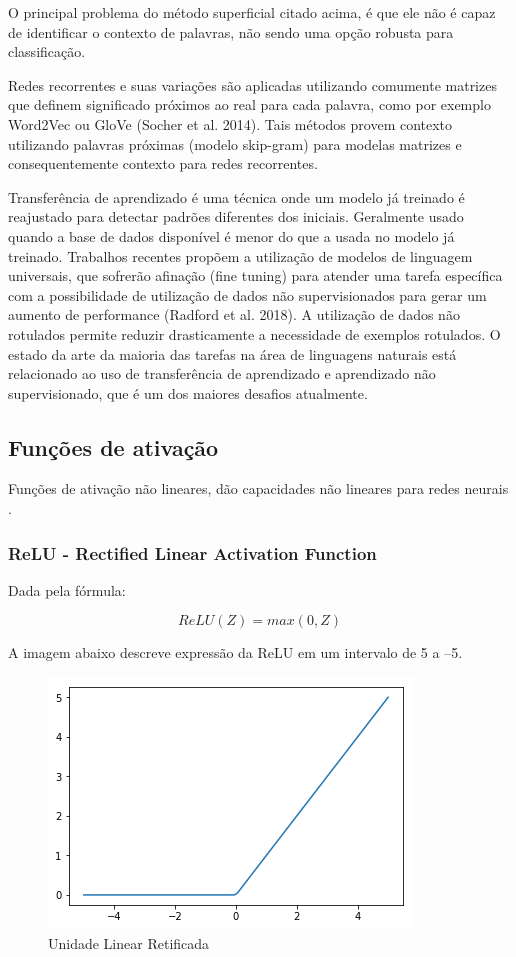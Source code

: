 \documentclass[12pt]{article}
\begin{document}
O principal problema do método superficial citado acima, é que ele não é capaz de identificar o contexto de palavras, não sendo uma opção robusta para classificação.

Redes recorrentes e suas variações são aplicadas utilizando comumente matrizes que definem significado próximos ao real para cada palavra, como por exemplo Word2Vec \cite{DBLP:journals/corr/abs-1301-3781} ou GloVe (Socher et al. 2014). Tais métodos provem contexto utilizando palavras próximas (modelo skip-gram) para modelas matrizes e consequentemente contexto para redes recorrentes.

Transferência de aprendizado é uma técnica onde um modelo já treinado é reajustado para detectar padrões diferentes dos iniciais. Geralmente usado quando a base de dados disponível é menor do que a usada no modelo já treinado. Trabalhos recentes propõem a utilização de modelos de linguagem universais, que sofrerão afinação (fine tuning) para atender uma tarefa específica \cite{DBLP:journals/corr/abs-1801-06146} com a possibilidade de utilização de dados não supervisionados para gerar um aumento de performance (Radford et al. 2018). A utilização de dados não rotulados permite reduzir drasticamente a necessidade de exemplos rotulados. O estado da arte da maioria das tarefas na área de linguagens naturais está relacionado ao uso de transferência de aprendizado e aprendizado não supervisionado, que é um dos maiores desafios atualmente.

\subsection{Funções de ativação}

Funções de ativação não lineares, dão capacidades não lineares para redes neurais \cite{lecun:98}.

\subsubsection{ReLU - Rectified Linear Activation Function}

Dada pela fórmula:

\begin{equation}
    ReLU(Z) = max(0, Z)
\end{equation}

A imagem abaixo descreve expressão da ReLU em um intervalo de 5 a –5.

\begin{figure}[ht]
\centering
\includegraphics[width=.5\textwidth]{images/relu.png}
\caption{Unidade Linear Retificada}
\label{fig:relu}
\end{figure}
\end{document}
